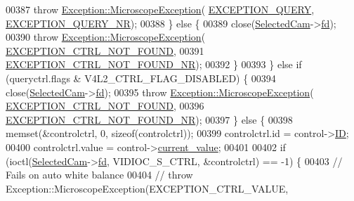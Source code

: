 \begin{DoxyCode}
00387       \textcolor{keywordflow}{throw} \hyperlink{class_hardware_1_1_exception_1_1_microscope_exception}{Exception::MicroscopeException}(
      \hyperlink{_microscope_not_found_exception_8h_aff89937633d667a17b2bff80551e4574}{EXCEPTION\_QUERY}, \hyperlink{_microscope_not_found_exception_8h_acb42acfdb2279208d47da5b3c3018f9d}{EXCEPTION\_QUERY\_NR});
00388     \} \textcolor{keywordflow}{else} \{
00389       close(\hyperlink{class_hardware_1_1_microscope_a059d62ec28e85f1c3f3225c9c78a877f}{SelectedCam}->\hyperlink{struct_hardware_1_1_microscope_1_1_cam__t_ab8d692f05f97f5f3cc0401f750d9ad2e}{fd});
00390       \textcolor{keywordflow}{throw} \hyperlink{class_hardware_1_1_exception_1_1_microscope_exception}{Exception::MicroscopeException}(
      \hyperlink{_microscope_not_found_exception_8h_ab2f26cdb6306df3f23ca653407f10cdf}{EXCEPTION\_CTRL\_NOT\_FOUND},
00391                                            \hyperlink{_microscope_not_found_exception_8h_a394040cb4491689f2ad71244f548d8c3}{EXCEPTION\_CTRL\_NOT\_FOUND\_NR});
00392     \}
00393   \} \textcolor{keywordflow}{else} \textcolor{keywordflow}{if} (queryctrl.flags & V4L2\_CTRL\_FLAG\_DISABLED) \{
00394     close(\hyperlink{class_hardware_1_1_microscope_a059d62ec28e85f1c3f3225c9c78a877f}{SelectedCam}->\hyperlink{struct_hardware_1_1_microscope_1_1_cam__t_ab8d692f05f97f5f3cc0401f750d9ad2e}{fd});
00395     \textcolor{keywordflow}{throw} \hyperlink{class_hardware_1_1_exception_1_1_microscope_exception}{Exception::MicroscopeException}(
      \hyperlink{_microscope_not_found_exception_8h_ab2f26cdb6306df3f23ca653407f10cdf}{EXCEPTION\_CTRL\_NOT\_FOUND},
00396                                          \hyperlink{_microscope_not_found_exception_8h_a394040cb4491689f2ad71244f548d8c3}{EXCEPTION\_CTRL\_NOT\_FOUND\_NR});
00397   \} \textcolor{keywordflow}{else} \{
00398     memset(&controlctrl, 0, \textcolor{keyword}{sizeof}(controlctrl));
00399     controlctrl.id = control->\hyperlink{struct_hardware_1_1_microscope_1_1_control__t_a7eb33f4df690ac0f388be1305722576d}{ID};
00400     controlctrl.value = control->\hyperlink{struct_hardware_1_1_microscope_1_1_control__t_ac86486f4807d9c9e7fe75d1983b057d3}{current\_value};
00401 
00402     \textcolor{keywordflow}{if} (ioctl(\hyperlink{class_hardware_1_1_microscope_a059d62ec28e85f1c3f3225c9c78a877f}{SelectedCam}->\hyperlink{struct_hardware_1_1_microscope_1_1_cam__t_ab8d692f05f97f5f3cc0401f750d9ad2e}{fd}, VIDIOC\_S\_CTRL, &controlctrl) == -1) \{
00403       \textcolor{comment}{// Fails on auto white balance}
00404       \textcolor{comment}{// throw Exception::MicroscopeException(EXCEPTION\_CTRL\_VALUE,}

\end{DoxyCode}
